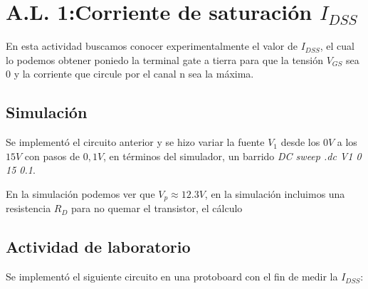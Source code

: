 \section{A.L. 1:Corriente de saturación $I_{DSS}$}

	\sangria{}En esta actividad buscamos conocer experimentalmente el valor de $I_{DSS}$, el cual lo podemos obtener poniedo la terminal gate a tierra para que la tensión $V_{GS}$ sea 0 y la corriente que circule por el canal n sea la máxima.
\begin{center}
\end{center}
	\subsection{Simulación}
\sangria{} Se implementó el circuito anterior y se hizo variar la fuente $V_1$ desde los $0V$ a los $15V$ con pasos de $0,1V$, en términos del simulador, un barrido \textit{DC sweep .dc V1 0 15 0.1}.

	\sangria{}En la simulación podemos ver que $V_p \approx 12.3V$, en la simulación incluimos una resistencia $R_D$ para no quemar el transistor, el cálculo

\subsection{Actividad de laboratorio}
\sangria{} Se implementó el siguiente circuito en una protoboard con el fin de medir la $I_{DSS}$:

